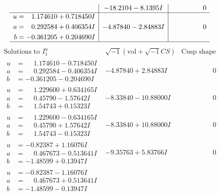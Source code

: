 \documentclass[1p]{elsarticle_modified}
\theoremstyle{definition}
\newcommand{\I}{\sqrt{-1}}
\begin{document}
$$\begin{array}{c|c|c}
 & -18.2104 - 8.1395 I & \phantom{-0.000000 } 0 \\ \hline\begin{aligned}
u &= \phantom{-}1.174610 + 0.718450 I \\
a &= \phantom{-}0.292584 + 0.406354 I \\
b &= -0.361205 + 0.204690 I\end{aligned}
 & -4.87840 - 2.84883 I & \phantom{-0.000000 } 0\\
 \hline 
 \end{array}$$\newpage$$\begin{array}{c|c|c}  
\text{Solutions to }I^u_{1}& \I (\text{vol} + \sqrt{-1}CS) & \text{Cusp shape}\\
 \hline 
\begin{aligned}
u &= \phantom{-}1.174610 - 0.718450 I \\
a &= \phantom{-}0.292584 - 0.406354 I \\
b &= -0.361205 - 0.204690 I\end{aligned}
 & -4.87840 + 2.84883 I & \phantom{-0.000000 } 0 \\ \hline\begin{aligned}
u &= \phantom{-}1.229600 + 0.634165 I \\
a &= \phantom{-}0.45790 - 1.57642 I \\
b &= \phantom{-}1.54743 + 0.15323 I\end{aligned}
 & -8.33840 - 10.88000 I & \phantom{-0.000000 } 0 \\ \hline\begin{aligned}
u &= \phantom{-}1.229600 - 0.634165 I \\
a &= \phantom{-}0.45790 + 1.57642 I \\
b &= \phantom{-}1.54743 - 0.15323 I\end{aligned}
 & -8.33840 + 10.88000 I & \phantom{-0.000000 } 0 \\ \hline\begin{aligned}
u &= -0.82387 + 1.16076 I \\
a &= \phantom{-}0.467673 - 0.513641 I \\
b &= -1.48599 + 0.13947 I\end{aligned}
 & -9.35763 + 5.83766 I & \phantom{-0.000000 } 0 \\ \hline\begin{aligned}
u &= -0.82387 - 1.16076 I \\
a &= \phantom{-}0.467673 + 0.513641 I \\
b &= -1.48599 - 0.13947 I\end{aligned}

\end{array}$$
\end{document}
